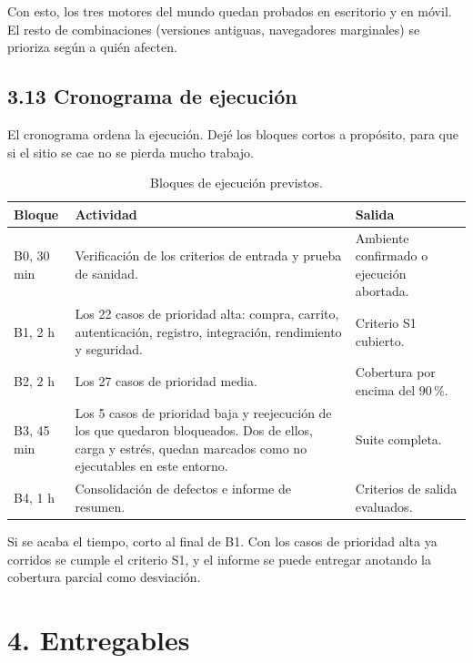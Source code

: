 \documentclass[11pt,a4paper]{article}
\begin{document}
Con esto, los tres motores del mundo quedan probados en escritorio y en móvil. El
resto de combinaciones (versiones antiguas, navegadores marginales) se prioriza
según a quién afecten.

\subsection*{3.13 Cronograma de ejecución}

El cronograma ordena la ejecución. Dejé los bloques cortos a propósito, para que si
el sitio se cae no se pierda mucho trabajo.

\begingroup
\small
\renewcommand{\arraystretch}{1.2}
\begin{table}[htb]\centering\small
\caption{Bloques de ejecución previstos.}\label{tab:crono}
\begin{tabularx}{\textwidth}{@{}L{2.4cm} L{5.4cm} Y@{}}
\toprule
\textbf{Bloque} & \textbf{Actividad} & \textbf{Salida} \\
\midrule
B0, 30 min & Verificación de los criterios de entrada y prueba de sanidad. & Ambiente confirmado o ejecución abortada. \\
B1, 2 h & Los 22 casos de prioridad alta: compra, carrito, autenticación, registro, integración, rendimiento y seguridad. & Criterio S1 cubierto. \\
B2, 2 h & Los 27 casos de prioridad media. & Cobertura por encima del 90\,\%. \\
B3, 45 min & Los 5 casos de prioridad baja y reejecución de los que quedaron bloqueados. Dos de ellos, carga y estrés, quedan marcados como no ejecutables en este entorno. & Suite completa. \\
B4, 1 h & Consolidación de defectos e informe de resumen. & Criterios de salida evaluados. \\
\bottomrule
\end{tabularx}
\end{table}
\endgroup

Si se acaba el tiempo, corto al final de B1. Con los casos de prioridad alta ya
corridos se cumple el criterio S1, y el informe se puede entregar anotando la
cobertura parcial como desviación.

\FloatBarrier
\section*{4. Entregables}
\end{document}

